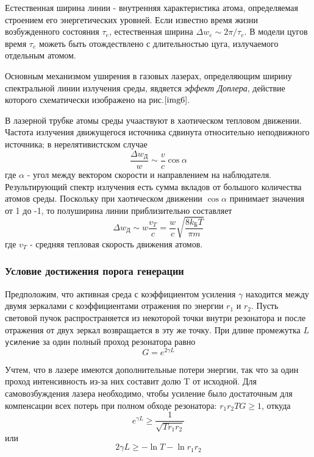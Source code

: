 \documentclass[a4paper,12pt]{article}
\begin{document}
Естественная ширина линии - внутренняя характеристика атома, определяемая строением его энергетических уровней. Если известно время жизни возбужденного состояния $\tau_e$, естественная ширина $\Delta w_e \sim 2\pi/\tau_e$. В модели цугов время $\tau_e$ можеть быть отождествлено с длительностью цуга, излучаемого отдельным атомом.

Основным механизмом уширения в газовых лазерах, определяющим ширину спектральной линии излучения среды, явдяется \textit{эффект Доплера}, действие которого схематически изображено на рис.$\ref{img6}$.

В лазерной трубке атомы среды учааствуют в хаотическом тепловом движении. Частота излучения движущегося источника сдвинута относительно неподвижного источника; в нерелятивистском случае
$$
\frac{\Delta w_\text{Д}}{w}\sim \frac{v}{c}\cos{\alpha}
$$
где $\alpha$ - угол между вектором скорости и направлением на наблюдателя. Результирующий спектр излучения есть сумма вкладов от большого количества атомов среды. Поскольку при хаотическом движении $\cos{\alpha}$ принимает значения от 1 до -1, то полуширина линии приблизительно составляет
\begin{equation}
    \Delta w_\text{Д}\sim w\frac{v_T}{c} = \frac{w}{c}\sqrt{\frac{8k_\text{Б}T}{\pi m}}
\end{equation}
где $v_T$ - средняя тепловая скорость движения атомов.

\subsubsection{Условие достижения порога генерации}

Предположим, что активная среда с коэффициентом усиления $\gamma$ находится между двумя зеркалами с коэффициентами отражения по энергии $r_1$ и $r_2$. Пусть световой пучок распространяется из некоторой точки внутри резонатора и после отражения от двух зеркал возвращается в эту же точку. При длине промежутка $L$ \texttt{усиление} за один полный проход резонатора равно
$$
G=e^{2\gamma L}
$$

Учтем, что в лазере имеются дополнительные потери энергии, так что за один проход интенсивность из-за них составит долю T от исходной. Для самовозбуждения лазера необходимо, чтобы усиление было достаточным для компенсации всех потерь при полном обходе резонатора: $r_1r_2TG\geq 1$, откуда
\begin{equation}
    e^{\gamma L}\geq \frac{1}{\sqrt{Tr_1r_2}}
\end{equation}
или
$$
2\gamma L \geq -\ln{T} - \ln{r_1r_2}
$$
\end{document}
